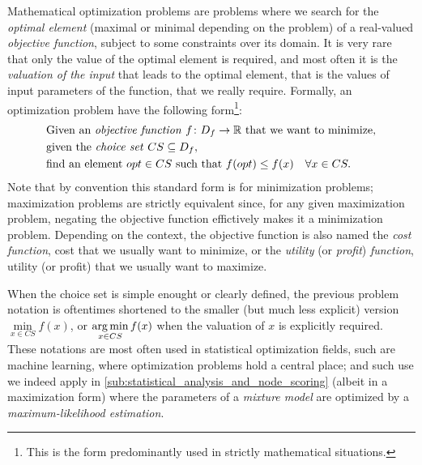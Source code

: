 	Mathematical optimization problems are problems where we search for the \emph{optimal element} (maximal or minimal depending on the problem) of a real-valued \emph{objective function}, subject to some constraints over its domain.
	It is very rare that only the value of the optimal element is required, and most often it is the \emph{valuation of the input} that leads to the optimal element, that is the values of input parameters of the function, that we really require.
	Formally, an optimization problem have the following form\footnote{This is the form predominantly used in strictly mathematical situations.}:
	\begin{align*}
		&\text{Given an \emph{objective function} }f\colon D_f \to \mathbb{R}\text{ that we want to minimize,}\\
		&\text{given the \emph{choice set} }CS \subseteq D_f,\\
		&\text{find an element }opt \in CS\text{ such that }f(opt) \leq f(x)\quad\forall x\in CS.
	\end{align*}
	Note that by convention this standard form is for minimization problems; maximization problems are strictly equivalent since, for any given maximization problem, negating the objective function effictively makes it a minimization problem.
	Depending on the context, the objective function is also named the \emph{cost function}, cost that we usually want to minimize, or the \emph{utility} (or \emph{profit}) \emph{function}, utility (or profit) that we usually want to maximize.

	When the choice set is simple enought or clearly defined, the previous problem notation is oftentimes shortened to the smaller (but much less explicit) version $\min\limits_{x\in CS}f(x)$, or $\operatorname*{arg\,min}\limits_{x\in CS}f(x)$ when the valuation of $x$ is explicitly required.
	These notations are most often used in statistical optimization fields, such are machine learning, where optimization problems hold a central place; and such use we indeed apply in \cref{sub:statistical_analysis_and_node_scoring} (albeit in a maximization form) where the parameters of a \emph{mixture model} are optimized by a \emph{maximum-likelihood estimation}.

